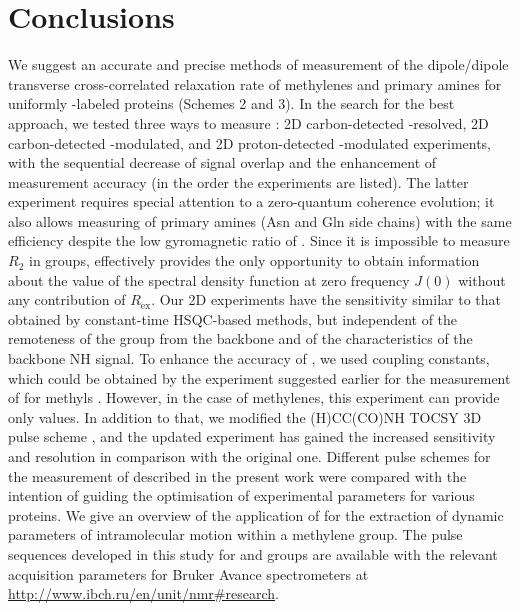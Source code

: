 \documentclass[twocolumn]{svjour3}           %
\begin{document}
\section{Conclusions}
\label{seq:conclusions}
We suggest an accurate and precise methods of measurement of the dipole/dipole 
transverse cross-correlated relaxation rate \gtwoXH{} of methylenes and primary 
amines for uniformly \nclab-labeled proteins (Schemes 2 and 3). In the search for the 
best approach, we tested three ways to measure \gtwoCH: 2D carbon-detected 
\oneJch-resolved, 2D carbon-detected \oneJch-modulated, and 2D proton-detected
\oneJxh-modulated experiments, with the sequential decrease of signal overlap 
and the enhancement of measurement accuracy (in the order the experiments are 
listed). The latter experiment requires special attention to a zero-quantum coherence evolution; it 
also allows measuring \gtwoNH{} of primary amines (Asn and Gln side chains) 
with the same efficiency despite the low gyromagnetic ratio of \nlab.
Since it is impossible to measure $R_2$ in \XHtwo{} groups, \gtwoXH{} 
effectively provides the only opportunity to obtain information about the 
value of the spectral density function at zero frequency $J(0)$ without any 
contribution of $R_\text{ex}$. Our 2D experiments have the sensitivity similar 
to that obtained by constant-time {HSQC}-based methods, but independent 
of the remoteness of the \CHtwo{} group from the backbone and of the 
characteristics of the backbone NH signal. To enhance the accuracy of \gtwoCH{}, 
we used \oneJch{} coupling constants, which could be obtained by the experiment
suggested earlier for the measurement of \gtwoCH{} for methyls 
\cite{zhang_probing_2006}. However, in the case of methylenes, this experiment 
can provide only \oneJch{} values. In addition to that, we modified the 
{(H)CC(CO)NH} {TOCSY} 3D pulse scheme \cite{zheng_measurement_2004}, and the 
updated experiment has gained the increased sensitivity and resolution in 
comparison with the original one. Different pulse schemes for the measurement 
of \gtwoXH{} described in the present work were compared with the intention 
of guiding the optimisation of experimental parameters for various proteins. 
We give an overview of the application of \gtwoCH{} for the extraction of 
dynamic parameters of intramolecular motion within a methylene group. 
The pulse sequences developed in this study for \labCHtwo{} and \labNHtwo{} 
groups are available with the relevant acquisition parameters for 
Bruker Avance spectrometers at 
\url{http://www.ibch.ru/en/unit/nmr#research}. 
\end{document}
